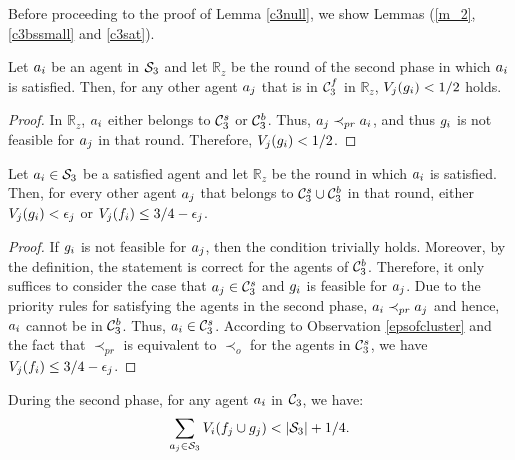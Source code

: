 Before proceeding to the proof of Lemma \ref{c3null}, we show Lemmas (\ref{m_2}, \ref{c3bssmall} and \ref{c3sat}). 

\begin{lemma}
\label{m_2}
Let $a_i$ be an agent in $\mathcal{S}_3$ and let ${\mathbb R}_z$ be the round of the second phase in which $a_i$ is satisfied. Then, for any other agent $a_j$ that is  in $\mathcal{C}_3^f$ in ${\mathbb R}_z$, $V_j(g_i) < 1/2$ holds.
\end{lemma}

\begin{proof}
In ${\mathbb R}_z$, $a_i$ either belongs to $\mathcal{C}_3^s$ or $\mathcal{C}_3^b$. Thus, $a_j \prec_{pr} a_i$, and thus $g_i$ is not feasible for $a_j$ in that round. Therefore, $V_j(g_i)< 1/2$.
\end{proof}

\begin{lemma}
\label{c3bssmall}
Let $a_i \in \mathcal{S}_3$ be a satisfied agent and let ${\mathbb R}_z$ be the round in which $a_i$ is satisfied. Then, for every other agent $a_j$ that belongs to $\mathcal{C}_3^s \cup \mathcal{C}_3^b$ in that round, either $V_j(g_i) < \epsilon_j$ or $V_j(f_i) \leq 3/4-\epsilon_j$.

\end{lemma}
\begin{proof}
If $g_i$ is not feasible for $a_j$, then the condition trivially holds. Moreover, by the definition, the statement is correct for the agents of $\mathcal{C}_3^b$. Therefore, it only suffices  to  consider the case that $a_j \in \mathcal{C}_3^s$ and $g_i$ is feasible for $a_j$. Due to the priority rules for satisfying the agents in the second phase, $a_i \prec_{pr} a_j$ and hence, $a_i$ cannot be in  $\mathcal{C}_3^b$. Thus, $a_i \in \mathcal{C}_3^s$. According to Observation \ref{epsofcluster} and the fact that $\prec_{pr}$ is equivalent to $\prec_{o}$ for the agents in $\mathcal{C}_3^s$, we have $V_j(f_i) \leq 3/4 - \epsilon_j$.
\end{proof}



\begin{lemma}
\label{c3sat}
During the second phase, for any agent  $a_i$ in  $\mathcal{C}_3$, we have: $$\sum_{a_j \in \mathcal{S}_3} V_i(f_j \cup g_j)< |\mathcal{S}_3| + 1/4.$$ 
\end{lemma}


